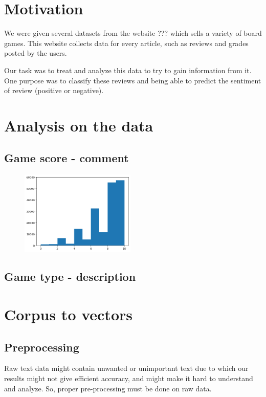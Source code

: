 \documentclass{article}
\begin{document}
\tableofcontents

\section{Motivation}

We were given several datasets from the website ??? which sells a variety of board games. This website collects data for every article, such as reviews and grades posted by the users. 

Our task was to treat and analyze this data to try to gain information from it. One purpose was to classify these reviews and being able to predict the sentiment of review (positive or negative). 

\section{Analysis on the data}

\subsection{Game score - comment}

\begin{figure}[h]
  \centering
  \includegraphics[height=4cm]{scores.png}
\end{figure}

\subsection{Game type - description}

\section{Corpus to vectors}

\subsection{Preprocessing}

Raw text data might contain unwanted or unimportant text due to which our results might not give efficient accuracy, and might make it hard to understand and analyze. So, proper pre-processing must be done on raw data.
\end{document}
